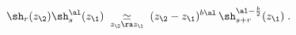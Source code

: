\begin{equation}\label{ope}
\sh_r(z_\2)\sh_s^{\al}(z_\1)\;\underset{z_\2\ra z_\1}{\simeq}\;
(z_\2-z_\1)^{b\al}\,\sh_{s+r}^{\al-\frac{b}{2}}(z_\1)\;.
\end{equation}

